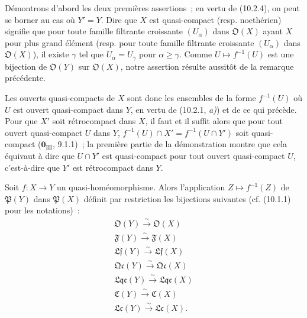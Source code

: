 Démontrons d'abord les deux premières assertions~; en vertu de (10.2.4), on
peut se borner au cas où $Y'=Y$. Dire que $X$ est quasi-compact (resp.
noethérien) signifie que pour toute famille filtrante croissante $(U_\alpha)$
dans $\mathfrak O(X)$ ayant $X$ pour plus grand élément (resp. pour toute
famille filtrante croissante $(U_\alpha)$ dans $\mathfrak O(X)$), il existe
$\gamma$ tel que $U_\alpha=U_\gamma$ pour $\alpha\geq\gamma$. Comme
$U\mapsto f^{-1}(U)$ est une bijection de $\mathfrak O(Y)$ sur
$\mathfrak O(X)$, notre assertion résulte aussitôt de la remarque précédente.

Les ouverts quasi-compacts de $X$ sont donc les ensembles de la forme
$f^{-1}(U)$ où $U$ est ouvert quasi-compact dans $Y$, en vertu de
(10.2.1, \emph{a)}) et de ce qui précède. Pour que $X'$ soit rétrocompact dans
$X$, il faut et il suffit alors que pour tout ouvert quasi-compact $U$ dans
$Y$, $f^{-1}(U)\cap X'=f^{-1}(U\cap Y')$ soit quasi-compact
($\mathbf 0_{\mathrm{III}}$, 9.1.1)~; la première partie de la démonstration
montre que cela équivaut à dire que $U\cap Y'$ est quasi-compact pour tout
ouvert quasi-compact $U$, c'est-à-dire que $Y'$ est rétrocompact dans $Y$.

\begin{proposition}[10.2.7]
\label{IV.10.2.7-fr}
Soit $f:X\to Y$ un quasi-homéomorphisme. Alors l'application
$Z\mapsto f^{-1}(Z)$ de $\mathfrak P(Y)$ dans $\mathfrak P(X)$ définit par
restriction les bijections suivantes (cf. (10.1.1) pour les notations)~:
\[
\begin{gathered}
\mathfrak O(Y)\xrightarrow{\sim}\mathfrak O(X)\\
\mathfrak F(Y)\xrightarrow{\sim}\mathfrak F(X)\\
\mathfrak{Lf}(Y)\xrightarrow{\sim}\mathfrak{Lf}(X)\\
\mathfrak{Qc}(Y)\xrightarrow{\sim}\mathfrak{Qc}(X)\\
\mathfrak{Lqc}(Y)\xrightarrow{\sim}\mathfrak{Lqc}(X)\\
\mathfrak C(Y)\xrightarrow{\sim}\mathfrak C(X)\\
\mathfrak{Lc}(Y)\xrightarrow{\sim}\mathfrak{Lc}(X).
\end{gathered}
\]
\end{proposition}

